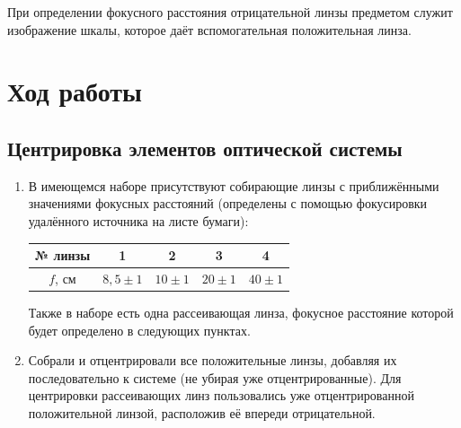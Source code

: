 \documentclass[a4paper,12pt]{article}
\begin{document}
	При определении фокусного расстояния отрицательной линзы предметом
	служит изображение шкалы, которое даёт вспомогательная положительная
	линза.
	
	\section*{Ход работы}
	
	\subsection*{Центрировка элементов оптической системы}
	\begin{enumerate}
		
		\item В имеющемся наборе присутствуют собирающие линзы с приближёнными значениями фокусных расстояний (определены с помощью фокусировки удалённого источника на листе бумаги):
		\begin{center}
			\begin{tabular}{|c|c|c|c|c|}
				\hline
				№ линзы & 1 & 2 & 3 & 4 \\ \hline
				$f$, см & $8,5\pm1$ & $10\pm1$ & $20\pm1$ & $40\pm1$ \\ \hline
			\end{tabular}
		\end{center}
		Также в наборе есть одна рассеивающая линза, фокусное расстояние которой будет определено в следующих пунктах.
		
		\item Собрали и отцентрировали все положительные линзы, добавляя их последовательно к системе (не убирая уже отцентрированные). Для центрировки рассеивающих линз пользовались уже отцентрированной положительной линзой, расположив её впереди отрицательной.
		
	\end{enumerate}
\end{document}
